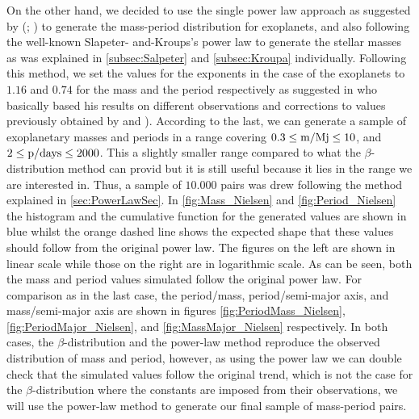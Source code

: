 On the other hand, we decided to use the single power law approach as suggested by (\citeyear{2008PASP..120..531C}; \citeyear{2006ApJ...646..505B}) to generate the mass-period distribution for exoplanets, and also following the well-known Slapeter- and-Kroups's power law to generate the stellar masses as was explained in \autoref{subsec:Salpeter} and \autoref{subsec:Kroupa} individually. Following this method, we set the values for the exponents in the case of the exoplanets to $1.16$ and $0.74$ for the mass and the period respectively as suggested in \citeyear{2010EAS....41..107N} who basically based his results on different observations and corrections to values previously obtained by \citeyear{2008PASP..120..531C} and \citeyear{2006ApJ...646..505B}). According to the last, we can generate a sample of exoplanetary masses and periods in a range covering $0.3 \leq \textnormal{m/Mj} \leq 10$, and $2 \leq \textnormal{p/days} \leq 2000$. This a slightly smaller range compared to what the $\beta$-distribution method can provid but it is still useful because it lies in the range we are interested in. Thus, a sample of $10.000$ pairs was drew following the method explained in \autoref{sec:PowerLawSec}. In \autoref{fig:Mass_Nielsen} and \autoref{fig:Period_Nielsen} the histogram and the cumulative function for the generated values are shown in blue whilst the orange dashed line shows the expected shape that these values should follow from the original power law. The figures on the left are shown in linear scale while those on the right are in logarithmic scale. As can be seen, both the mass and period values simulated follow the original power law. For comparison as in the last case, the period/mass, period/semi-major axis, and mass/semi-major axis are shown in figures \autoref{fig:PeriodMass_Nielsen},\autoref{fig:PeriodMajor_Nielsen}, and  \autoref{fig:MassMajor_Nielsen} respectively. In both cases, the $\beta$-distribution and the power-law method reproduce the observed distribution of mass and period, however, as using the power law we can double check that the simulated values follow the original trend, which is not the case for the $\beta$-distribution where the constants are imposed from their observations, we will use the power-law method to generate our final sample of mass-period pairs.\\ 

